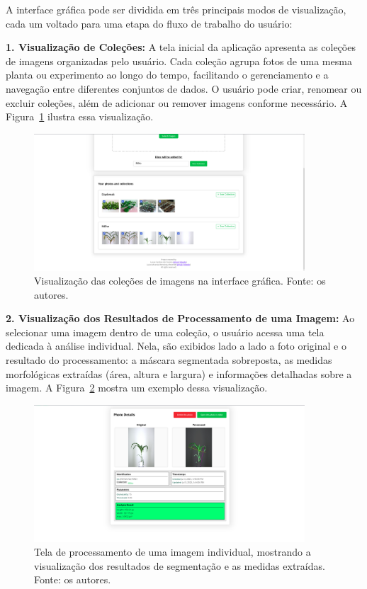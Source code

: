 A interface gráfica pode ser dividida em três principais modos de visualização, cada um voltado para uma etapa do fluxo de trabalho do usuário:

\textbf{1. Visualização de Coleções:} A tela inicial da aplicação apresenta as coleções de imagens organizadas pelo usuário. Cada coleção agrupa fotos de uma mesma planta ou experimento ao longo do tempo, facilitando o gerenciamento e a navegação entre diferentes conjuntos de dados. O usuário pode criar, renomear ou excluir coleções, além de adicionar ou remover imagens conforme necessário. A Figura~\ref{fig:colecoes} ilustra essa visualização.

\begin{figure}[H]
    \centering
    \includegraphics[width=0.9\textwidth]{../figures/screens/colecoes.png}
    \caption{Visualização das coleções de imagens na interface gráfica. Fonte: os autores.}
    \label{fig:colecoes}
\end{figure}

\textbf{2. Visualização dos Resultados de Processamento de uma Imagem:} Ao selecionar uma imagem dentro de uma coleção, o usuário acessa uma tela dedicada à análise individual. Nela, são exibidos lado a lado a foto original e o resultado do processamento: a máscara segmentada sobreposta, as medidas morfológicas extraídas (área, altura e largura) e informações detalhadas sobre a imagem. A Figura~\ref{fig:processamento-individual} mostra um exemplo dessa visualização.

\begin{figure}[H]
    \centering
    \includegraphics[width=0.9\textwidth]{../figures/screens/processamento-individual.png}
    \caption{Tela de processamento de uma imagem individual, mostrando a visualização dos resultados de segmentação e as medidas extraídas. Fonte: os autores.}
    \label{fig:processamento-individual}
\end{figure}

